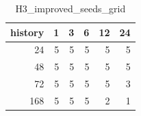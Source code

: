\begin{table}
\caption{H3_improved_seeds_grid}
\label{tab:H3_improved_seeds_grid}
\begin{tabular}{rrrrrr}
\toprule
history & 1 & 3 & 6 & 12 & 24 \\
\midrule
24 & 5 & 5 & 5 & 5 & 5 \\
48 & 5 & 5 & 5 & 5 & 5 \\
72 & 5 & 5 & 5 & 5 & 3 \\
168 & 5 & 5 & 5 & 2 & 1 \\
\bottomrule
\end{tabular}
\end{table}
